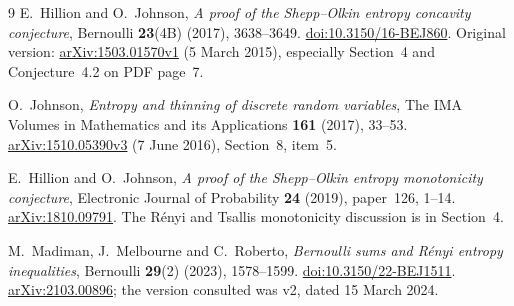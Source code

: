 \documentclass[11pt]{article}
\numberwithin{equation}{section}
\theoremstyle{definition}
\theoremstyle{remark}
\begin{document}
\begin{thebibliography}{9}
E.~Hillion and O.~Johnson,
\emph{A proof of the Shepp--Olkin entropy concavity conjecture},
Bernoulli \textbf{23}(4B) (2017), 3638--3649.
\href{https://doi.org/10.3150/16-BEJ860}{doi:10.3150/16-BEJ860}.
Original version: \href{https://arxiv.org/abs/1503.01570}{arXiv:1503.01570v1}
(5 March 2015), especially Section~4 and Conjecture~4.2 on PDF page~7.

O.~Johnson,
\emph{Entropy and thinning of discrete random variables},
The IMA Volumes in Mathematics and its Applications \textbf{161} (2017),
33--53.
\href{https://arxiv.org/abs/1510.05390}{arXiv:1510.05390v3}
(7 June 2016), Section~8, item~5.

E.~Hillion and O.~Johnson,
\emph{A proof of the Shepp--Olkin entropy monotonicity conjecture},
Electronic Journal of Probability \textbf{24} (2019), paper~126, 1--14.
\href{https://arxiv.org/abs/1810.09791}{arXiv:1810.09791}.
The R\'enyi and Tsallis monotonicity discussion is in Section~4.

M.~Madiman, J.~Melbourne and C.~Roberto,
\emph{Bernoulli sums and R\'enyi entropy inequalities},
Bernoulli \textbf{29}(2) (2023), 1578--1599.
\href{https://doi.org/10.3150/22-BEJ1511}{doi:10.3150/22-BEJ1511}.
\href{https://arxiv.org/abs/2103.00896}{arXiv:2103.00896}; the version consulted
was v2, dated 15 March 2024.
\end{thebibliography}
\end{document}

